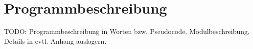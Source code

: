 	\chapter{Programmbeschreibung}\label{cha:program_description}
	TODO: Programmbeschreibung in Worten bzw. Pseudocode, Modulbeschreibung, Details in evtl. Anhang auslagern.